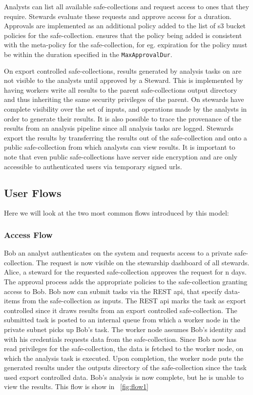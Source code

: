Analysts can list all available safe-collections and request access to ones that they require.
Stewards evaluate these requests and approve access for a duration. Approvals are implemented as an additional
policy added to the list of s3 bucket policies for the safe-collection. \NAME ensures that the policy
being added is consistent with the meta-policy for the safe-collection, for eg. expiration for the policy
must be within the duration specified in the \texttt{MaxApprovalDur}.

On export controlled safe-collections, results generated by analysis tasks on \NAME are not visible to the
analysts until approved by a Steward. This is implemented by having workers write all results to the
parent safe-collections output directory and thus inheriting the same security privileges of the parent.
On \NAME stewards have complete visibility over the set of inputs, and operations made by the analysts
in order to generate their results. It is also possible to trace the provenance of the results from an
analysis pipeline since all analysis tasks are logged.
Stewards export the results by transferring the results out of the safe-collection and onto a public
safe-collection from which analysts can view results. It is important to note that even public
safe-collections have server side encryption and are only accessible to authenticated users via temporary
signed urls.


\subsection{User Flows}

Here we will look at the two most common flows introduced by this model:

\subsubsection{Access Flow}

Bob an analyst authenticates on the system and requests access to a private safe-collection.
The request is now visible on the stewarship dashboard of all stewards. Alice, a steward for the requested
safe-collection approves the request for n days. The approval process adds the appropriate policies to the
safe-collection granting access to Bob. Bob now can submit tasks via the  REST api, that specify data-items
from the safe-collection as inputs. The REST api marks the task as export controlled since it draws results
from an export controlled safe-collection. The submitted task is posted to an internal queue from which a
worker node in the \NAME private subnet picks up Bob's task. The worker node assumes Bob's identity and with
his credentials requests data from the safe-collection. Since Bob now has read privileges for the
safe-collection, the data is fetched to the worker node, on which the analysis task is executed.
Upon completion, the worker node puts the generated results under the outputs directory of the safe-collection
since the task used export controlled data. Bob's analysis is now complete, but he is unable to view the
results. This flow is show in \figurename~\ref{fig:flow1}

